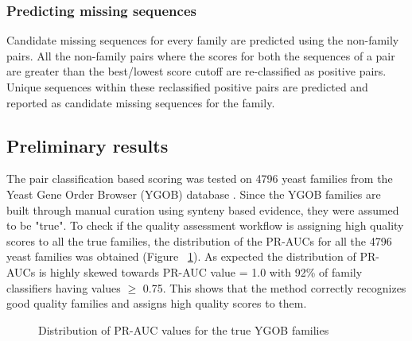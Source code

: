 \documentclass{article}
\begin{document}
			\subsubsection{Predicting missing sequences}
			Candidate missing sequences for every family are predicted using the non-family pairs. All the non-family pairs where the scores for both the sequences of a pair are greater than the best/lowest score cutoff are re-classified as positive pairs. Unique sequences within these reclassified positive pairs are predicted and reported as candidate missing sequences for the family.
			
		\subsection{Preliminary results}
		The pair classification based scoring was tested on 4796 yeast families from the Yeast Gene Order Browser (YGOB) database \citep{byrne2005yeast}. Since the YGOB families are built through manual curation using synteny based evidence, they were assumed to be "true". To check if the quality assessment workflow is assigning high quality scores to all the true families, the distribution of the PR-AUCs for all the 4796 yeast families was obtained (Figure ~\ref{fig:hist_pr-auc_true_ygob}). As expected the distribution of PR-AUCs is highly skewed towards PR-AUC value = 1.0 with 92\% of family classifiers having values $\geq$ 0.75. This shows that the method correctly recognizes good quality families and assigns high quality scores to them.
		
		\begin{figure}
			\caption{Distribution of PR-AUC values for the true YGOB families}
			\label{fig:hist_pr-auc_true_ygob}
		\end{figure}
		
\end{document}
